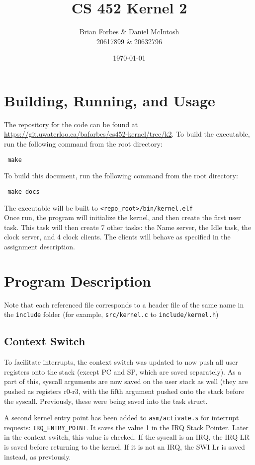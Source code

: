 \documentclass{article}
\begin{document}
\title{CS 452 Kernel 2}
\author{Brian Forbes \& Daniel McIntosh \\ 20617899 \& 20632796}
\date{\today}

\maketitle

\section{Building, Running, and Usage}

The repository for the code can be found at \url{https://git.uwaterloo.ca/baforbes/cs452-kernel/tree/k2}.
To build the executable, run the following command from the root directory: \begin{verbatim} make \end{verbatim}
To build this document, run the following command from the root directory: \begin{verbatim} make docs \end{verbatim}
The executable will be built to \verb|<repo_root>/bin/kernel.elf|\\

Once run, the program will initialize the kernel, and then create the first user task. This task will then create 7 other tasks: the Name server, the Idle task, the clock server, and 4 clock clients. The clients will behave as specified in the assignment description.

\section{Program Description}
Note that each referenced file corresponds to a header file of the same name in the \verb|include| folder (for example, \verb|src/kernel.c| to \verb|include/kernel.h|)
\subsection{Context Switch}
    To facilitate interrupts, the context switch was updated to now push all user registers onto the stack (except PC and SP, which are saved separately). As a part of this, syscall arguments are now saved on the user stack as well (they are pushed as registers r0-r3, with the fifth argument pushed onto the stack before the syscall. Previously, these were being saved into the task struct.

    A second kernel entry point has been added to \verb|asm/activate.s| for interrupt requests: \verb|IRQ_ENTRY_POINT|. It saves the value 1 in the IRQ Stack Pointer. Later in the context switch, this value is checked. If the syscall is an IRQ, the IRQ LR is saved before returning to the kernel. If it is not an IRQ, the SWI Lr is saved instead, as previously.
\end{document}
